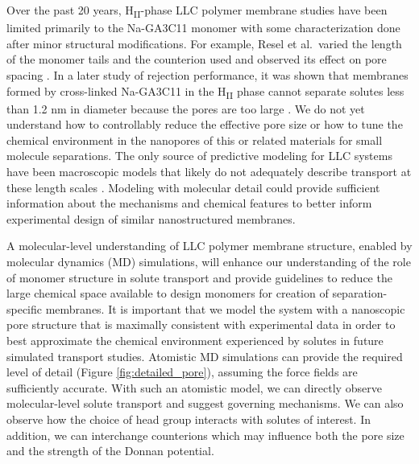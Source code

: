   Over the past 20 years, H\textsubscript{II}-phase LLC polymer membrane
  studies have been limited primarily to the Na-GA3C11 monomer with some
  characterization done after minor structural modifications. For example, Resel
  et al.~varied the length of the monomer tails and the counterion used and
  observed its effect on pore spacing \cite{resel_structural_2000}. In a later
  study of rejection performance, it was shown that membranes formed by
  cross-linked Na-GA3C11 in the H\textsubscript{II} phase cannot separate solutes
  less than 1.2 nm in diameter because the pores are too large
  \cite{zhou_supported_2005}. We do not yet understand how to controllably reduce
  the effective pore size or how to tune the chemical environment in the
  nanopores of this or related materials for small molecule separations. The only
  source of predictive modeling for LLC systems have been macroscopic models that
  likely do not adequately describe transport at these length scales
  \cite{hatakeyama_water_2011}. Modeling with molecular detail could provide
  sufficient information about the mechanisms and chemical features to better
  inform experimental design of similar nanostructured membranes. 

  A molecular-level understanding of LLC polymer membrane structure, enabled by
  molecular dynamics (MD) simulations, will enhance our understanding of the role
  of monomer structure in solute transport and provide guidelines to reduce the 
  large chemical space available to design monomers for creation of 
  separation-specific membranes. It is important that we model the system with
  a nanoscopic pore structure that is maximally consistent with experimental data
  in order to best approximate the chemical environment experienced by solutes
  in future simulated transport studies. Atomistic MD simulations can provide the required
  level of detail (Figure \ref{fig:detailed_pore}), assuming the force fields are
  sufficiently accurate. With such an atomistic model, we can directly observe
  molecular-level solute transport and suggest governing mechanisms. We can also
  observe how the choice of head group interacts with solutes of interest. In
  addition, we can interchange counterions which may influence both the pore size
  and the strength of the Donnan potential. 

